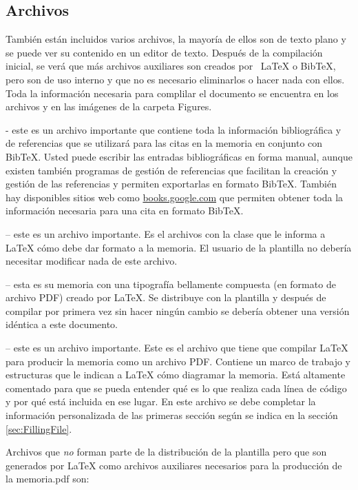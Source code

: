 \subsection{Archivos}

También están incluidos varios archivos, la mayoría de ellos son de texto plano y se puede ver su contenido en un editor de texto. Después de la compilación inicial, se verá que más archivos auxiliares son creados por \ LaTeX{} o BibTeX, pero son de uso interno y que no es necesario eliminarlos o hacer nada con ellos.  Toda la información necesaria para complilar el documento se encuentra en los archivos  y en las imágenes de la carpeta Figures.

 - este es un archivo importante que contiene toda la información bibliográfica y de referencias que se utilizará para las citas en la memoria en conjunto con BibTeX. Usted puede escribir las entradas bibliográficas en forma manual, aunque existen también programas de gestión de referencias que facilitan la creación y gestión de las referencias y permiten exportarlas en formato BibTeX.  También hay disponibles sitios web como \url{books.google.com} que permiten obtener toda la información necesaria para una cita en formato BibTeX.

 -- este es un archivo importante. Es el archivos con la clase que le informa a \LaTeX{} cómo debe dar formato a la memoria. El usuario de la plantilla no debería necesitar modificar nada de este archivo.

 -- esta es su memoria con una tipografía bellamente compuesta (en formato de archivo PDF) creado por \LaTeX{}. Se distribuye con la plantilla y después de compilar por primera vez sin hacer ningún cambio se debería obtener una versión idéntica a este documento.

 -- este es un archivo importante. Este es el archivo que tiene que compilar \LaTeX{} para producir la memoria como un archivo PDF. Contiene un marco de trabajo y estructuras que le indican a \LaTeX{} cómo diagramar la memoria.  Está altamente comentado para que se pueda entender qué es lo que realiza cada línea de código y por qué está incluida en ese lugar.  En este archivo se debe completar la información personalizada de las primeras sección según se indica en la sección \ref{sec:FillingFile}.

Archivos que \emph{no} forman parte de la distribución de la plantilla pero que son generados por \LaTeX{} como archivos auxiliares necesarios para la producción de la memoria.pdf son:

